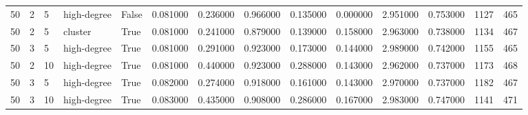 \begin{table}
\begin{tabular}{llllllllllllll}
50 & 2 & 5 & high-degree & False & 0.081000 & 0.236000 & 0.966000 & 0.135000 & 0.000000 & 2.951000 & 0.753000 & 1127 & 465 \\
50 & 2 & 5 & cluster & True & 0.081000 & 0.241000 & 0.879000 & 0.139000 & 0.158000 & 2.963000 & 0.738000 & 1134 & 467 \\
50 & 3 & 5 & high-degree & True & 0.081000 & 0.291000 & 0.923000 & 0.173000 & 0.144000 & 2.989000 & 0.742000 & 1155 & 465 \\
50 & 2 & 10 & high-degree & True & 0.081000 & 0.440000 & 0.923000 & 0.288000 & 0.143000 & 2.962000 & 0.737000 & 1173 & 468 \\
50 & 3 & 5 & high-degree & True & 0.082000 & 0.274000 & 0.918000 & 0.161000 & 0.143000 & 2.970000 & 0.737000 & 1182 & 467 \\
50 & 3 & 10 & high-degree & True & 0.083000 & 0.435000 & 0.908000 & 0.286000 & 0.167000 & 2.983000 & 0.747000 & 1141 & 471 \\
\bottomrule
\end{tabular}
\end{table}
